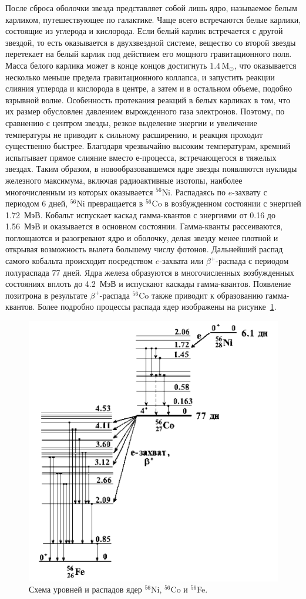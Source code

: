 \documentclass[a4paper, 14pt]{extarticle}
\def\M{\mathrm{M}_\odot}
\begin{document}
После сброса оболочки звезда представляет собой лишь ядро, называемое 
белым карликом, путешествующее по галактике. Чаще всего встречаются 
белые карлики, состоящие из углерода и кислорода. Если белый карлик 
встречается с другой звездой, то есть оказывается в двухзвездной 
системе, вещество со второй звезды перетекает на белый карлик под 
действием его мощного гравитационного поля. Масса белого карлика может 
в конце концов достигнуть $1.4\,\M$, что оказывается несколько меньше 
предела гравитационного коллапса, и запустить реакции слияния углерода 
и кислорода в центре, а затем и в остальном объеме, подобно взрывной 
волне. Особенность протекания реакций в белых карликах в том, что их 
размер обусловлен давлением вырожденного газа электронов. Поэтому, по 
сравнению с центром звезды, резкое выделение энергии и увеличение 
температуры не приводит к сильному расширению, и реакция проходит 
существенно быстрее. Благодаря чрезвычайно высоким температурам, кремний 
испытывает прямое слияние вместо е-процесса, встречающегося в тяжелых 
звездах. Таким образом, в новообразовавшемся ядре звезды появляются 
нуклиды железного максимума, включая радиоактивные изотопы, наиболее 
многочисленным из которых оказывается $^{56}$Ni. Распадаясь по 
$e$-захвату с периодом 6 дней, $^{56}$Ni превращается в $^{56}$Co 
в возбужденном состоянии с энергией 1.72~МэВ. Кобальт испускает каскад 
гамма-квантов с энергиями от 0.16 до 1.56~МэВ и оказывается в основном 
состоянии. Гамма-кванты рассеиваются, поглощаются и разогревают ядро 
и оболочку, делая звезду менее плотной и открывая возможность вылета 
большему числу фотонов. Дальнейший распад самого кобальта происходит 
посредством $e$-захвата или $\beta^+$-распада с периодом полураспада 77 
дней. Ядра железа образуются в многочисленных возбужденных состояниях 
вплоть до 4.2~МэВ и испускают каскады гамма-квантов. Появление позитрона 
в результате $\beta^+$-распада $^{56}$Co также приводит к образованию  
гамма-квантов. Более подробно процессы распада ядер изображены на 
рисунке~\ref{fig:NiCoFe}.

\begin{figure}%
	\centering
	\includegraphics[width=.5\linewidth]{figures/nsf33.gif.pdf}
	\caption{Схема уровней и распадов ядер $^{56}$Ni, $^{56}$Co и $^{56}$Fe.}
	\label{fig:NiCoFe}
\end{figure}%
\end{document}
